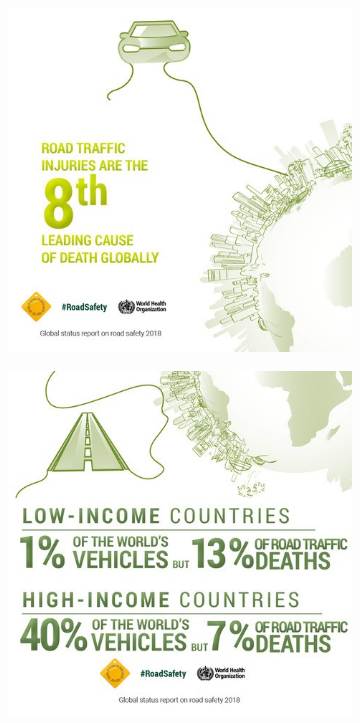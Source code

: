 \begin{figure}[H]
\begin{subfigure}[c]{0.3\textwidth}
		\label{fig:test_image_3}
	\end{subfigure}
	\medskip
	\begin{subfigure}[c]{0.3\textwidth}
		\includegraphics[width=\textwidth]{img/road_safety/8th-leading-cause.jpg}
		\label{fig:test_image_4}
	\end{subfigure}
	\quad
	\begin{subfigure}[c]{0.3\textwidth}
		\includegraphics[width=\textwidth]{img/road_safety/Low-income-countries.jpg}

\end{subfigure}
\end{figure}
